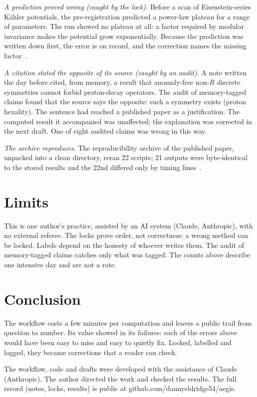 \documentclass[aps,prd,twocolumn,superscriptaddress,nofootinbib,showkeys]{revtex4-2}
\begin{document}
\emph{A prediction proved wrong (caught by the lock).} Before a scan of Eisenstein-series K\"ahler potentials, the pre-registration predicted a power-law plateau for a range of parameters. The run showed no plateau at all: a factor required by modular invariance makes the potential grow exponentially. Because the prediction was written down first, the error is on record, and the correction names the missing factor~\cite{P2}.

\emph{A citation stated the opposite of its source (caught by an audit).} A note written the day before cited, from memory, a result that anomaly-free non-$R$ discrete symmetries cannot forbid proton-decay operators. The audit of memory-tagged claims found that the source says the opposite: such a symmetry exists (proton hexality). The sentence had reached a published paper as a justification. The computed result it accompanied was unaffected; the explanation was corrected in the next draft. One of eight audited claims was wrong in this way.

\emph{The archive reproduces.} The reproducibility archive of the published paper, unpacked into a clean directory, reran 22 scripts; 21 outputs were byte-identical to the stored results and the 22nd differed only by timing lines~\cite{SERAPIS}.

\section{Limits}
This is one author's practice, assisted by an AI system (Claude, Anthropic), with no external referee. The locks prove order, not correctness: a wrong method can be locked. Labels depend on the honesty of whoever writes them. The audit of memory-tagged claims catches only what was tagged. The counts above describe one intensive day and are not a rate.

\section{Conclusion}
The workflow costs a few minutes per computation and leaves a public trail from question to number. Its value showed in its failures: each of the errors above would have been easy to miss and easy to quietly fix. Locked, labelled and logged, they became corrections that a reader can check.

\begin{acknowledgments}
The workflow, code and drafts were developed with the assistance of Claude (Anthropic). The author directed the work and checked the results. The full record (notes, locks, results) is public at github.com/dannyeldridge54/aegis.
\end{acknowledgments}
\end{document}
